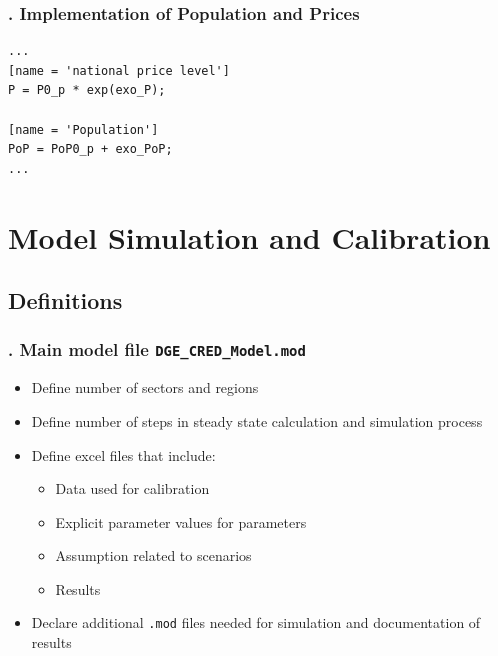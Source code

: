 \documentclass[11pt,aspectratio=169]{beamer}
\begin{document}
\begin{frame}[fragile]
\frametitle{{\thesection.\thesubsection} Implementation of Population and Prices}

\begin{lstlisting}[frame = single]
...
[name = 'national price level']
P = P0_p * exp(exo_P);

[name = 'Population']
PoP = PoP0_p + exo_PoP;
...
\end{lstlisting}
\end{frame}




\section{Model Simulation and Calibration}
\subsection{Definitions}
\begin{frame}
\frametitle{{\thesection.\thesubsection} Main model file  \texttt{DGE\_CRED\_Model.mod}}
\begin{itemize}
\item Define number of sectors and regions 
\item Define number of steps in steady state calculation and simulation process  
\item Define excel files that include:
	\begin{itemize}
		\item Data used for calibration
		\item Explicit parameter values for parameters
		\item Assumption related to scenarios
		\item Results 
	\end{itemize}
\item Declare additional  \texttt{.mod} files needed for simulation and documentation of results   
\end{itemize}
\end{frame}
\end{document}
